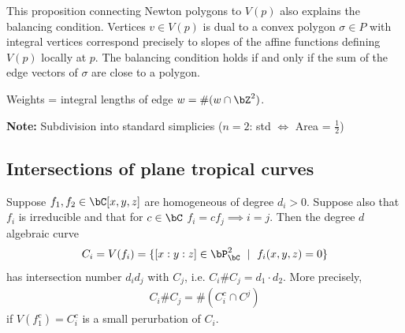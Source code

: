 This proposition connecting Newton polygons to $V(p)$ also explains the balancing condition. Vertices $v \in V(p)$ is dual to a convex polygon $\sigma \in P$ with integral vertices correspond precisely to slopes of the affine functions defining $V(p)$ locally at $p$. The balancing condition holds if and only if the sum of the edge vectors of $\sigma$ are close to a polygon.

Weights = integral lengths of edge $w = \#(w \cap \bZ^2)$.

\textbf{Note:} Subdivision into standard simplicies ($n = 2$: std $\iff $ Area = $\frac{1}{2}$)

\subsection{Intersections of plane tropical curves}

\begin{thm}\label{thm:bezout-thm}
  Suppose $f_1,f_2 \in \bC[x,y,z]$ are homogeneous of degree $d_i > 0$. Suppose also that $f_i$ is irreducible and that for $c \in \bC$ $f_i = cf_j \implies i = j$. Then the degree $d$ algebraic curve
  \begin{align*}
    C_i = V(f_i) = \{[x:y:z] \in \bP^2_\bC ~\mid~ f_i(x,y,z) = 0\}
  \end{align*}
  has intersection number $d_id_j$ with $C_j$, i.e. $C_i \# C_j = d_1\cdot d_2$. More precisely, \begin{align*}
    C_i\# C_j = \#(C_i^c \cap C^j)
  \end{align*}
  if $V(f_1^c) = C_i^c$ is a small perurbation of $C_i$.
\end{thm}
\printbibliography

